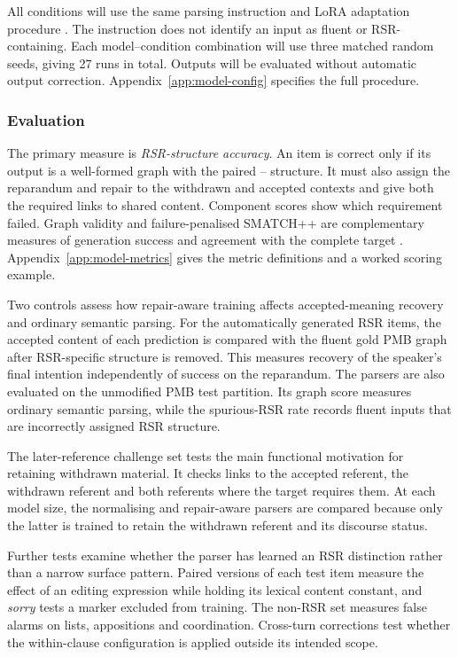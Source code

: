 \documentclass{article}
\begin{document}
All conditions will use the same parsing instruction and LoRA adaptation procedure
\citep{huLoRALowRankAdaptation2021}. The instruction does not identify an input
as fluent or RSR-containing. Each model--condition combination will use three
matched random seeds, giving 27 runs in total. Outputs will be evaluated
without automatic output correction. Appendix~\ref{app:model-config}
specifies the full procedure.

\subsubsection{Evaluation}

The primary measure is \emph{RSR-structure accuracy}. An item is correct
only if its output is a well-formed graph with the paired
-- structure. It must also assign the
reparandum and repair to the withdrawn and accepted contexts and give both the
required links to shared content. Component scores show which requirement
failed.
Graph validity and failure-penalised SMATCH++ are complementary measures
of generation success and agreement with the complete target
\citep{opitzSMATCHStandardizedExtended2023}. Appendix~\ref{app:model-metrics}
gives the metric definitions and a worked scoring example.

Two controls assess how repair-aware training affects accepted-meaning
recovery and ordinary semantic parsing. For the
automatically generated RSR items, the accepted content of each prediction is
compared with the fluent gold PMB graph after RSR-specific structure is
removed. This measures recovery of the speaker's final intention independently
of success on the reparandum. The parsers are also evaluated on the unmodified
PMB test partition. Its graph score measures ordinary semantic parsing, while
the spurious-RSR rate records fluent inputs that are incorrectly assigned RSR
structure.

The later-reference challenge set tests the main functional motivation for
retaining withdrawn material. It checks links to the accepted referent, the
withdrawn referent and both referents where the target requires them. At each
model size, the normalising and repair-aware parsers are compared because only
the latter is trained to retain the withdrawn referent and its discourse
status.

Further tests examine whether the parser has learned an RSR distinction rather
than a narrow surface pattern. Paired versions of each test item measure the
effect of an editing expression while holding its lexical content constant, and
\textit{sorry} tests a marker excluded from training. The non-RSR set
measures false alarms on lists, appositions and coordination. Cross-turn
corrections test whether the within-clause configuration is applied outside
its intended scope.
\end{document}
